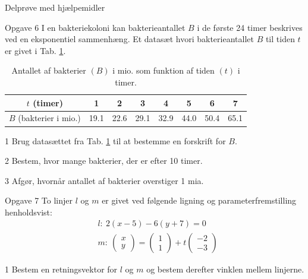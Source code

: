 \documentclass[12pt,x11names,a4paper]{article}
\begin{document}
\newpage
\begin{center}
\LARGE
Delprøve med hjælpemidler 
\end{center}

\begin{opgavetekst}{Opgave 6}
	I en bakteriekoloni kan bakterieantallet $B$ i de første 24 timer beskrives ved en eksponentiel sammenhæng. Et datasæt hvori bakterieantallet $B$ til tiden $t$ er givet i 
	Tab. \ref{tab:bakterie}.
	\begin{table}[H]
		\centering
		\begin{tabular}{c|c|c|c|c|c|c|c}
		$t$ (timer) &1 & 2 & 3 & 4 & 5 & 6 & 7 \\
		\hline
		$B$ (bakterier i mio.) & 19.1 & 22.6 & 29.1 & 32.9 & 44.0 & 50.4 & 65.1
		\end{tabular}
		\caption{Antallet af bakterier $(B)$ i mio. som funktion af tiden $(t)$ i timer. }
		\label{tab:bakterie}
	\end{table}\phantom{h}
\end{opgavetekst}
\begin{delopgave}{}{1}
	Brug datasættet fra Tab. \ref{tab:bakterie} til at bestemme en forskrift for $B$.
\end{delopgave}
\begin{delopgave}{}{2}
	Bestem, hvor mange bakterier, der er efter 10 timer. 
\end{delopgave}
\begin{delopgave}{}{3}
	Afgør, hvornår antallet af bakterier overstiger 1 mia.
\end{delopgave}
\begin{opgavetekst}{Opgave 7}
	To linjer $l$ og $m$ er givet ved følgende ligning og parameterfremstilling henholdsvist:
	\begin{align*}
		&l: \ 2(x-5)-6(y+7) = 0 \\
		&m: \ 
		\begin{pmatrix}
			x \\ y
		\end{pmatrix}=
		\begin{pmatrix}
			1 \\ 1
		\end{pmatrix} + t
		\begin{pmatrix}
			-2 \\ -3
		\end{pmatrix}
	\end{align*}
\end{opgavetekst}
\begin{delopgave}{}{1}
	Bestem en retningsvektor for $l$ og $m$ og bestem derefter vinklen mellem linjerne. 
\end{delopgave}
\end{document}

